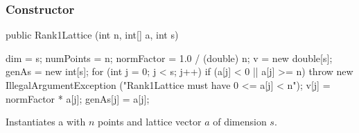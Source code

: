 \subsubsection*{Constructor}
\begin{code}

   public Rank1Lattice (int n, int[] a, int s) \begin{hide} {
      dim = s;
      numPoints = n;
      normFactor = 1.0 / (double) n;
      v = new double[s];
      genAs = new int[s];
      for (int j = 0; j < s; j++) {
         if (a[j] < 0 || a[j] >= n)
            throw new IllegalArgumentException
               ("Rank1Lattice must have 0 <= a[j] < n");
         v[j] = normFactor * a[j];
         genAs[j] = a[j];
      }
   }\end{hide}
\end{code}
 \begin{tabb}
   Instantiates a  with $n$ points and lattice
   vector $a$ of dimension $s$.
 \end{tabb}
\begin{htmlonly}
\end{htmlonly}

